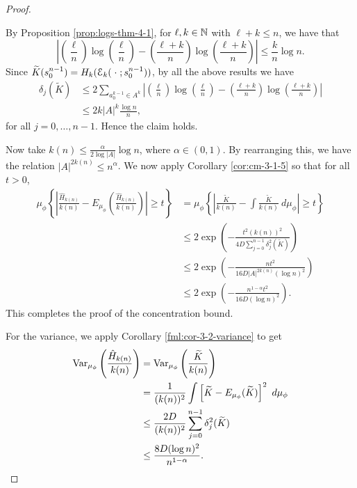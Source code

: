 \begin{theorem}
\begin{proof}
\begin{claim}
			By Proposition \ref{prop:logs-thm-4-1}, for $\ell, k \in \mathbb{N}$ with $\ell+ k \leq n$, we have that
			\[
				\left|\left(\frac{\ell}{n}\right)\log\left(\frac{\ell}{n}\right) - \left(\frac{\ell + k}{n}\right)\log\left(\frac{\ell + k}{n}\right)\right| \leq \frac{k}{n}\log{n}.
			\]
			Since $\widetilde{K}(s_0^{n - 1}) = H_k(\mathcal{E}_k(\mathrel{}\cdot\mathrel{}; s_0^{n - 1}))$, by all the above results we have
			\begin{align*}
				\delta_j(\tilde{K}) &\leq 2\sum_{a_0^{k - 1} \in A^k}{\left|\left(\frac{\ell}{n}\right)\log\left(\frac{\ell}{n}\right) - \left(\frac{\ell + k}{n}\right)\log\left(\frac{\ell + k}{n}\right)\right|} \\
				 &\leq 2k|A|^k \frac{\log{n}}{n},
			\end{align*}
			for all $j = 0, \dots, n - 1$. Hence the claim holds.
		\end{claim}
		
		Now take $k(n) \leq \frac{\alpha}{2\log{|A|}}\log{n}$, where $\alpha \in (0, 1)$. By rearranging this, we have the relation $|A|^{2k(n)} \leq n^\alpha$. We now apply Corollary \ref{cor:cm-3-1-5} so that for all $t > 0$,
		\begin{align*}
			\mu_\phi\left\{\left| \frac{\hat{H}_{k(n)}}{k(n)} - E_{\mu_\phi}\left(\frac{\hat{H}_{k(n)}}{k(n)}\right) \right| \geq t\right\} &= \mu_\phi\left\{\left| \frac{\tilde{K}}{k(n)} - \int{\frac{\tilde{K}}{k(n)}\ d\mu_\phi} \right| \geq t\right\} \\
				&\leq 2\exp\left(-\frac{t^2 (k(n))^2}{4D\sum_{j = 0}^{n - 1}{\delta_j^2(\tilde{K})}}\right) \\
				&\leq 2\exp\left(-\frac{nt^2}{16D|A|^{2k(n)} (\log{n})^2}\right) \\
				&\leq 2\exp\left(-\frac{n^{1 - \alpha} t^2}{16D (\log{n})^2}\right).
		\end{align*}
		This completes the proof of the concentration bound.
		
		For the variance, we apply Corollary \ref{fml:cor-3-2-variance} to get
		\begin{align*}
			\operatorname{Var}_{\mu_\phi}\left(\frac{\hat{H}_{k(n)}}{k(n)}\right) &= \operatorname{Var}_{\mu_\phi}\left(\frac{\widetilde{K}}{k(n)}\right) \\
				&= \frac{1}{(k(n))^2}\int{\left[\widetilde{K} - E_{\mu_\phi}(\widetilde{K})\right]^2\ d\mu_\phi} \\
				&\leq \frac{2D}{(k(n))^2}\sum_{j = 0}^{n - 1}{\delta_j^2(\widetilde{K})} \\
				&\leq \frac{8D (\log{n})^2}{n^{1 - \alpha}}.
		\end{align*}
	\end{proof}
\end{theorem}

